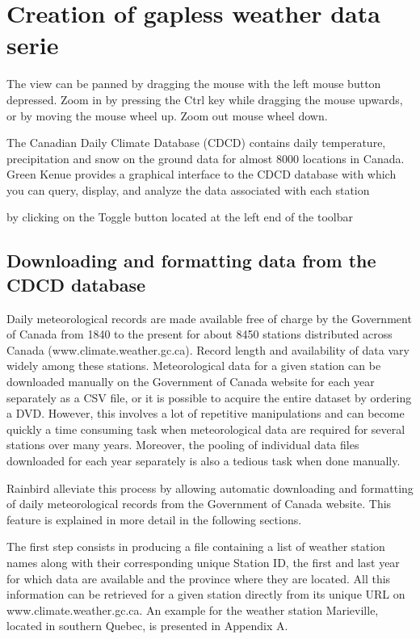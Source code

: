 \documentclass[12pt, letterpaper, fleqn]{report}
\begin{document}
\section{Creation of gapless weather data serie}

The view can be panned by dragging the mouse with the left mouse button depressed. Zoom in by pressing the Ctrl key while dragging the mouse upwards, or by moving the mouse wheel up. Zoom out mouse wheel down.

The Canadian Daily Climate Database (CDCD) contains daily temperature, precipitation and snow on the ground data for almost 8000 locations in Canada. Green Kenue provides a graphical interface to the CDCD database with which you can query, display, and analyze the data associated with each station

by clicking on the Toggle button located at the left end of the toolbar

\subsection{Downloading and formatting data from the CDCD database}

Daily meteorological records are made available free of charge by the Government of Canada from 1840 to the present for about 8450 stations distributed across Canada (www.climate.weather.gc.ca). Record length and availability of data vary widely among these stations. Meteorological data for a given station can be downloaded manually on the Government of Canada website for each year separately as a CSV file, or it is possible to acquire the entire dataset by ordering a DVD. However, this involves a lot of repetitive manipulations and can become quickly a time consuming task when meteorological data are required for several stations over many years. Moreover, the pooling of individual data files downloaded for each year separately is also a tedious task when done manually.

Rainbird alleviate this process by allowing automatic downloading and formatting of daily meteorological records from the Government of Canada website. This feature is explained in more detail in the following sections.

The first step consists in producing a file containing a list of weather station names along with their corresponding unique Station ID, the first and last year for which data are available and the province where they are located. All this information can be retrieved for a given station directly from its unique URL on www.climate.weather.gc.ca. An example for the weather station Marieville, located in southern Quebec, is presented in Appendix A.
\end{document}
